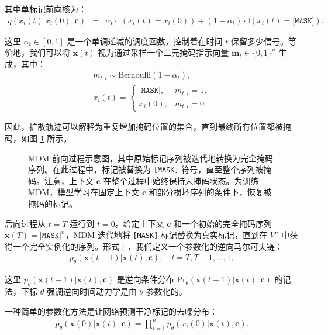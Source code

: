 \noindent 其中单标记前向核为：
\begin{eqnarray}
q(x_i(t) | x_i(0), \mathbf{c}) & = &\alpha_t \cdot \mathbb{I}(x_i(t)=x_i(0)) + (1-\alpha_t)\cdot \mathbb{I}(x_i(t)=\texttt{[MASK]}). \label{eq:mdm-forward-absorbing}
\end{eqnarray}

\noindent 这里 $\alpha_t \in [0,1]$ 是一个单调递减的调度函数，控制着在时间 $t$ 保留多少信号。等价地，我们可以将 $\mathbf{x}(t)$ 视为通过采样一个二元掩码指示向量 $\mathbf{m}_t\in\{0,1\}^n$ 生成，其中：
\begin{eqnarray}
m_{t,i} \sim \mathrm{Bernoulli}(1-\alpha_t), \\
x_i(t) = \begin{cases}
\texttt{[MASK]}, & m_{t,i}=1, \\
x_i(0), & m_{t,i}=0.
\end{cases}
\label{eq:mdm-forward-maskvar}
\end{eqnarray}

\noindent 因此，扩散轨迹可以解释为重复增加掩码位置的集合，直到最终所有位置都被掩码，如图 \ref{fig:mdm-diffusion-process} 所示。

\begin{figure}[!t]
\centering
{}
\caption{MDM 前向过程示意图，其中原始标记序列被迭代地转换为完全掩码序列。在此过程中，标记被替换为 \texttt{[MASK]} 符号，直至整个序列被掩码。注意，上下文 $\mathbf{c}$ 在整个过程中始终保持未掩码状态。为训练 MDM，模型学习在固定上下文 $\mathbf{c}$ 和部分损坏序列的条件下，恢复被掩码的标记。}
\label{fig:mdm-diffusion-process}
\end{figure}

后向过程从 $t=T$ 运行到 $t=0$。给定上下文 $\mathbf{c}$ 和一个初始的完全掩码序列 $\mathbf{x}(T)=\texttt{[MASK]}^n$，MDM 迭代地将 \texttt{[MASK]} 标记替换为真实标记，直到在 $V^n$ 中获得一个完全实例化的序列。形式上，我们定义一个参数化的逆向马尔可夫链：
\begin{eqnarray}
p_\theta(\mathbf{x}(t-1)| \mathbf{x}(t), \mathbf{c}), \quad t=T,T-1,\dots,1,
\label{eq:mdm-reverse-kernel}
\end{eqnarray}

\noindent 这里 $p_\theta(\mathbf{x}(t-1)| \mathbf{x}(t),\mathbf{c})$ 是逆向条件分布 $\mathrm{Pr}_\theta(\mathbf{x}(t-1)| \mathbf{x}(t),\mathbf{c})$ 的记法，下标 $\theta$ 强调逆向时间动力学是由 $\theta$ 参数化的。

一种简单的参数化方法是让网络预测干净标记的去噪分布：
\begin{eqnarray}
p_\theta(\mathbf{x}(0)| \mathbf{x}(t), \mathbf{c}) = \prod_{i=1}^{n} p_\theta(x_i(0)| \mathbf{x}(t), \mathbf{c}).
\label{eq:mdm-denoise-factorize}
\end{eqnarray}


